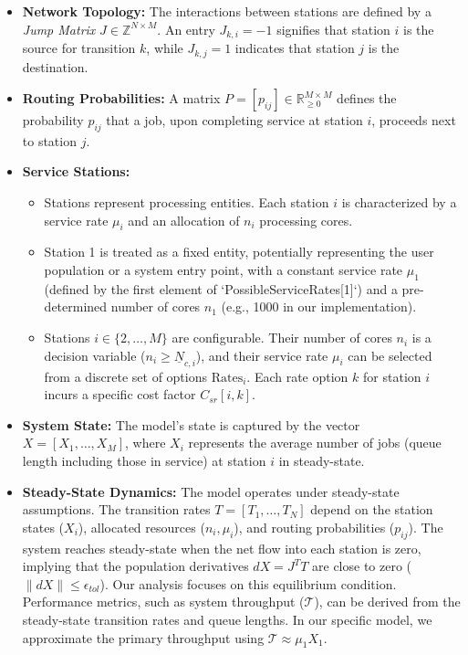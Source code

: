 \documentclass{article}
\begin{document}
\begin{itemize}
    \item \textbf{Network Topology:} The interactions between stations are defined by a \emph{Jump Matrix} \(J \in \mathbb{Z}^{N \times M}\). An entry \(J_{k,i} = -1\) signifies that station \(i\) is the source for transition \(k\), while \(J_{k,j} = 1\) indicates that station \(j\) is the destination.
    \item \textbf{Routing Probabilities:} A matrix \(P = [p_{ij}] \in \mathbb{R}^{M \times M}_{\ge 0}\) defines the probability \(p_{ij}\) that a job, upon completing service at station \(i\), proceeds next to station \(j\).
    \item \textbf{Service Stations:}
        \begin{itemize}
            \item Stations represent processing entities. Each station \(i\) is characterized by a service rate \(\mu_i\) and an allocation of \(n_i\) processing cores.
            \item Station 1 is treated as a fixed entity, potentially representing the user population or a system entry point, with a constant service rate \(\mu_1\) (defined by the first element of `PossibleServiceRates[1]`) and a pre-determined number of cores \(n_1\) (e.g., 1000 in our implementation).
            \item Stations \(i \in \{2, \dots, M\}\) are configurable. Their number of cores \(n_i\) is a decision variable (\(n_i \ge \underline{N}_{c,i}\)), and their service rate \(\mu_i\) can be selected from a discrete set of options \(\text{Rates}_i\). Each rate option \(k\) for station \(i\) incurs a specific cost factor \(C_{sr}[i,k]\).
        \end{itemize}
    \item \textbf{System State:} The model's state is captured by the vector \(X = [X_1, \dots, X_M]\), where \(X_i\) represents the average number of jobs (queue length including those in service) at station \(i\) in steady-state.
    \item \textbf{Steady-State Dynamics:} The model operates under steady-state assumptions. The transition rates \(T = [T_1, \dots, T_N]\) depend on the station states (\(X_i\)), allocated resources (\(n_i, \mu_i\)), and routing probabilities (\(p_{ij}\)). The system reaches steady-state when the net flow into each station is zero, implying that the population derivatives \(dX = J^T T\) are close to zero (\(\|dX\| \le \epsilon_{tol}\)). Our analysis focuses on this equilibrium condition. Performance metrics, such as system throughput (\(\mathcal{T}\)), can be derived from the steady-state transition rates and queue lengths. In our specific model, we approximate the primary throughput using \(\mathcal{T} \approx \mu_1 X_1\).
\end{itemize}
\end{document}
